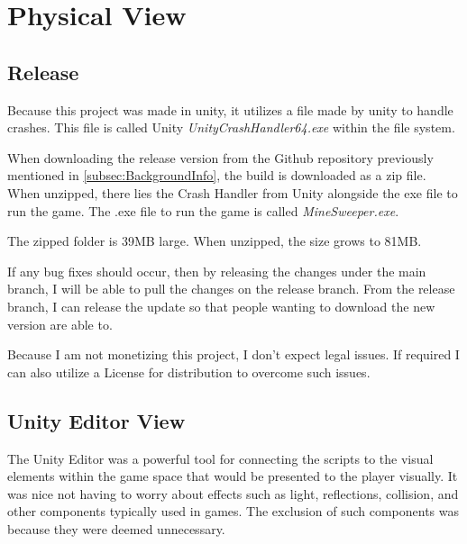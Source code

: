 \section{Physical View}
\label{sec:PhysView}

\subsection{Release}
\label{subsec:Release}

Because this project was made in unity, it utilizes a file made by unity to handle crashes.
This file is called Unity \textit{UnityCrashHandler64.exe} within the file system.

When downloading the release version from the Github repository previously mentioned in \ref{subsec:BackgroundInfo}, the build is downloaded as a zip file.
When unzipped, there lies the Crash Handler from Unity alongside the exe file to run the game.
The .exe file to run the game is called \textit{MineSweeper.exe}.

The zipped folder is 39MB large.
When unzipped, the size grows to 81MB.

If any bug fixes should occur, then by releasing the changes under the main branch, I will be able to pull the changes on the release branch.
From the release branch, I can release the update so that people wanting to download the new version are able to.

Because I am not monetizing this project, I don't expect legal issues.
If required I can also utilize a License for distribution to overcome such issues.

\subsection{Unity Editor View}
\label{subsec:UEView}

The Unity Editor was a powerful tool for connecting the scripts to the visual elements within the game space that would be presented to the player visually.
It was nice not having to worry about effects such as light, reflections, collision, and other components typically used in games.
The exclusion of such components was because they were deemed unnecessary.

